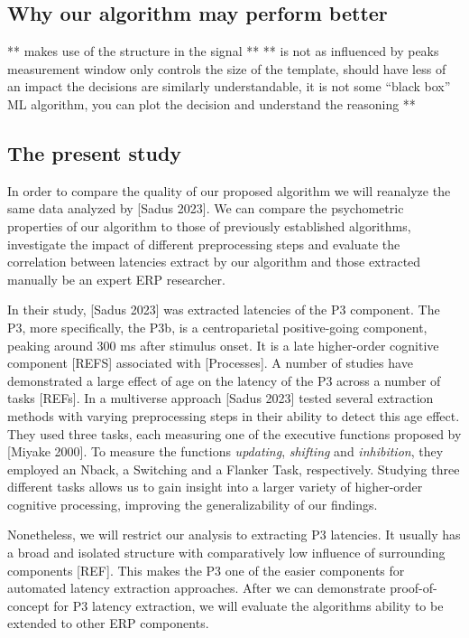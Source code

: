 \documentclass[
  man,floatsintext]{apa7}
\begin{document}
\hypertarget{why-our-algorithm-may-perform-better}{%
\subsection{Why our algorithm may perform better}\label{why-our-algorithm-may-perform-better}}

** makes use of the structure in the signal **
** is not as influenced by peaks \textbf{
} measurement window only controls the size of the template, should have less of an impact \textbf{
} the decisions are similarly understandable, it is not some ``black box'' ML algorithm, you can plot the decision and understand the reasoning **

\hypertarget{the-present-study}{%
\subsection{The present study}\label{the-present-study}}

In order to compare the quality of our proposed algorithm we will reanalyze the same data analyzed by {[}Sadus 2023{]}. We can compare the psychometric properties of our algorithm to those of previously established algorithms, investigate the impact of different preprocessing steps and evaluate the correlation between latencies extract by our algorithm and those extracted manually be an expert ERP researcher.

In their study, {[}Sadus 2023{]} was extracted latencies of the P3 component. The P3, more specifically, the P3b, is a centroparietal positive-going component, peaking around 300 ms after stimulus onset. It is a late higher-order cognitive component {[}REFS{]} associated with {[}Processes{]}. A number of studies have demonstrated a large effect of age on the latency of the P3 across a number of tasks {[}REFs{]}. In a multiverse approach {[}Sadus 2023{]} tested several extraction methods with varying preprocessing steps in their ability to detect this age effect. They used three tasks, each measuring one of the executive functions proposed by {[}Miyake 2000{]}. To measure the functions \emph{updating}, \emph{shifting} and \emph{inhibition}, they employed an Nback, a Switching and a Flanker Task, respectively. Studying three different tasks allows us to gain insight into a larger variety of higher-order cognitive processing, improving the generalizability of our findings.

Nonetheless, we will restrict our analysis to extracting P3 latencies. It usually has a broad and isolated structure with comparatively low influence of surrounding components {[}REF{]}. This makes the P3 one of the easier components for automated latency extraction approaches. After we can demonstrate proof-of-concept for P3 latency extraction, we will evaluate the algorithms ability to be extended to other ERP components.
\end{document}
